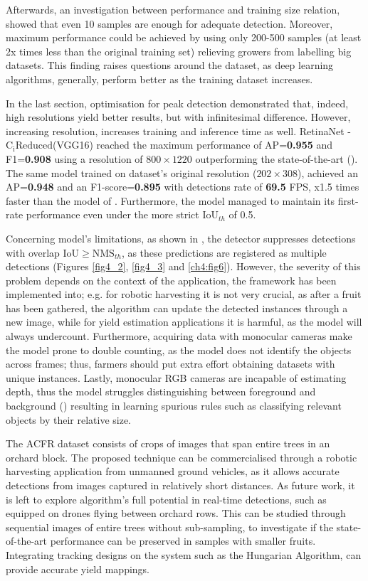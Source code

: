 Afterwards, an investigation between performance and training size relation, showed that even 10 samples are enough for adequate detection. Moreover, maximum performance could be achieved by using only 200-500 samples (at least 2x times less than the original training set) relieving growers from labelling big datasets. This finding raises questions around the dataset, as deep learning algorithms, generally, perform better as the training dataset increases.

In the last section, optimisation for peak detection demonstrated that, indeed, high resolutions yield better results, but with infinitesimal difference. However, increasing resolution, increases training and inference time as well. RetinaNet - $\text{C}_\text{i}\text{Reduced}$(VGG16) reached the maximum performance of AP=\textbf{0.955} and F1=\textbf{0.908} using a resolution of $800\times1220$ outperforming the state-of-the-art (\cite{bargoti2017deep}). The same model trained on dataset's original resolution ($202\times308$), achieved an AP=\textbf{0.948} and an F1-score=\textbf{0.895} with detections rate of \textbf{69.5} FPS, x1.5 times faster than the model of \cite{liang2018apple}. Furthermore, the model managed to maintain its first-rate performance even under the more strict $\text{IoU}_{th}$ of 0.5.

Concerning model's limitations, as shown in , the detector suppresses detections with overlap $\text{IoU}\geq\text{NMS}_{th}$, as these predictions are registered as multiple detections (Figures \ref{fig4_2}, \ref{fig4_3} and \ref{ch4:fig6}). However, the severity of this problem depends on the context of the application, the framework has been implemented into; e.g. for robotic harvesting it is not very crucial, as after a fruit has been gathered, the algorithm can update the detected instances through a new image, while for yield estimation applications it is harmful, as the model will always undercount. Furthermore, acquiring data with monocular cameras make the model prone to double counting, as the model does not identify the objects across  frames; thus, farmers should put extra effort obtaining datasets with unique instances. Lastly, monocular RGB cameras are incapable of estimating depth, thus the model struggles distinguishing between foreground and background () resulting in learning spurious rules such as classifying relevant objects by their relative size.

The ACFR dataset consists of crops of images that span entire trees in an orchard block. The proposed technique can be commercialised through a robotic harvesting application from unmanned ground vehicles, as it allows accurate detections from images captured in relatively short distances. As future work, it is left to explore algorithm's full potential in real-time detections, such as equipped on drones flying between orchard rows. This can be studied through sequential images of entire trees without sub-sampling, to investigate if the state-of-the-art performance can be preserved in samples with smaller fruits. Integrating tracking designs on the system such as the Hungarian Algorithm, can provide accurate yield mappings.


